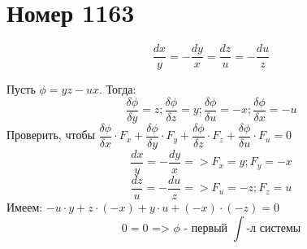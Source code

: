 \section*{Номер 1163}
$$ \dfrac{dx}{y} = - \dfrac{dy}{x} = \dfrac{dz}{u} = - \dfrac{du}{z} $$

\begin{solution}
    Пусть $ \phi = yz - ux $. Тогда:
    $$ \dfrac{\delta \phi}{\delta y} = z; \dfrac{\delta \phi}{\delta z} = y; \dfrac{\delta \phi}{\delta u} = -x; \dfrac{\delta \phi}{\delta x} = -u $$
    Проверить, чтобы $ \dfrac{\delta \phi}{\delta x} \cdot F_x + \dfrac{\delta \phi}{\delta y} \cdot F_y + \dfrac{\delta \phi}{\delta z} \cdot F_z + \dfrac{\delta \phi}{\delta u} \cdot F_u = 0 $
    $$ \dfrac{dx}{y} = - \dfrac{dy}{x} => F_x = y; F_y = -x $$
    $$ \dfrac{dz}{u} = - \dfrac{du}{z} => F_u = -z; F_z = u $$
    Имеем: $ -u \cdot y + z \cdot (-x) + y \cdot u + (-x) \cdot (-z) = 0 $
    $$ 0 = 0 \text{ => $\phi$ - первый $\int$-л системы} $$


\end{solution}\pagebreak